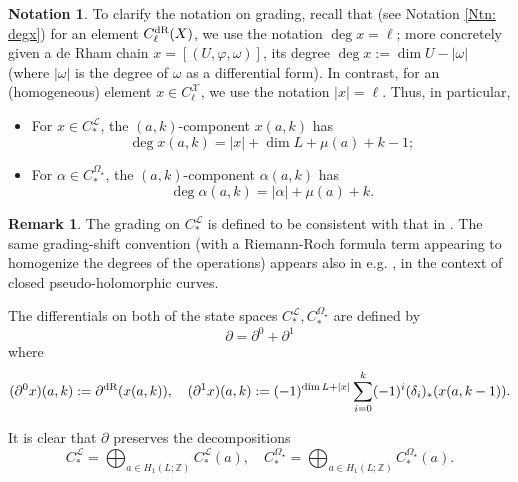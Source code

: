 \documentclass[10pt]{amsart}
\numberwithin{equation}{section}
\theoremstyle{plain}
\theoremstyle{definition}
\newtheorem{notation}[theorem]{Notation}
\newtheorem{remark}[theorem]{Remark}
\theoremstyle{remark}
\numberwithin{equation}{section}
\newcommand{\Z}{\mathbb{Z}}
\newcommand{\dR}{\textup{dR}}
\newcommand{\CFr}{C_*^\mathscr{L}}
\newcommand{\CBa}{C_*^{\Omega_\star}}
\begin{document}
{\begin{notation}\label{Ntn: DegConvert}
	To clarify the notation on grading, recall that (see Notation \ref{Ntn: degx}) for an element $C_\ell^\dR(X)$, we use the notation $\deg x = \ell$; more concretely given a de Rham chain $x=[(U,\varphi,\omega)]$, its degree $\deg x := \dim U - |\omega|$ (where $|\omega|$ is the degree of $\omega$ as a differential form). In contrast, for an (homogeneous) element $x\in C_\ell^\mathcal{X}$, we use the notation $|x|=\ell$. Thus, in particular,
	\begin{itemize}
		\item For $x\in \CFr$, the $(a,k)$-component $x(a,k)$ has \begin{equation}\label{Eq: DegConvertFree}\deg x(a,k) = |x|+\dim L +\mu(a) + k -1; \end{equation}
		\item For $\alpha\in \CBa$, the $(a,k)$-component $\alpha(a,k)$ has \begin{equation}\label{Eq: DegConvertBased}
				 \deg \alpha(a,k) = |\alpha| + \mu(a) + k. 
			\end{equation}
	\end{itemize}
\end{notation}
\begin{remark}
	The grading on $\CFr$ is defined to be consistent with that in \cite{Irie2}. The same grading-shift convention (with a Riemann-Roch formula term appearing to homogenize the degrees of the operations) appears also in e.g. \cite{SullivanSigma}, in the context of closed pseudo-holomorphic curves.
\end{remark}

The differentials on both of the state spaces $\CFr,\CBa$ are defined by \begin{equation}\label{Eq: differential}\partial = \partial^0 + \partial^1\end{equation} where
\begin{equation}\label{Eq: differentialExplicit}
	(\partial^0 x)(a,k):= \partial^\dR(x(a,k)),\quad (\partial^1 x)(a,k):= (-1)^{\dim L + |x|}\sum_{i=0}^k (-1)^i(\delta_i)_*(x(a,k-1)).
\end{equation}




It is clear that $\partial$ preserves the decompositions \[ \CFr = \bigoplus_{a\in H_1(L;\Z)} \CFr(a),\quad \CBa = \bigoplus_{a\in H_1(L;\Z)} \CBa(a). \]


\bigskip

}
\end{document}
